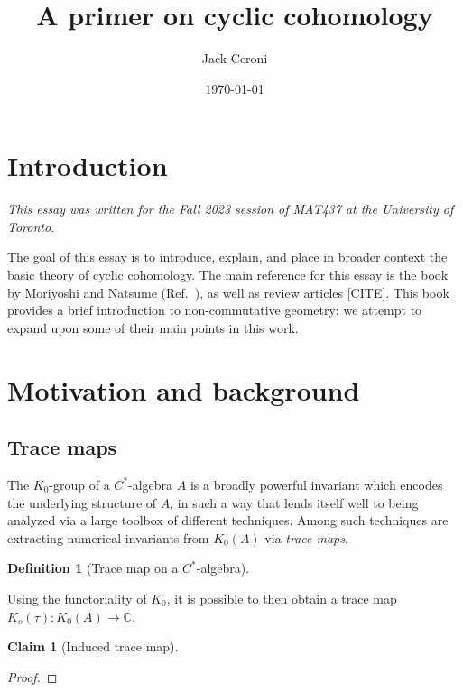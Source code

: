 \documentclass[aps,pra,showpacs,notitlepage,onecolumn,superscriptaddress,nofootinbib]{revtex4-1}
\newcommand{\hhrulefill}{\hspace{-1.0em}\hrulefill}
\theoremstyle{definition}
\newtheorem{definition}{Definition}[section]
\newtheorem{claim}{Claim}[section]
\begin{document}
\title{A primer on cyclic cohomology}
\author{Jack Ceroni}

\date{\today}

\maketitle

\section{Introduction}

\noindent \emph{This essay was written for the Fall 2023 session of MAT437 at the University of Toronto.}
\newline

\noindent The goal of this essay is to introduce, explain, and place in broader context the basic theory of cyclic cohomology. The main reference
for this essay is the book by Moriyoshi and Natsume (Ref.~\cite{}), as well as review articles [CITE]. This book provides a brief introduction to non-commutative geometry: we attempt
to expand upon some of their main points in this work.

\hhrulefill

\section{Motivation and background}

\subsection{Trace maps}

\noindent The $K_0$-group of a $C^{*}$-algebra $A$ is a broadly powerful invariant which encodes the underlying structure of $A$, in such a way that lends
itself well to being analyzed via a large toolbox of different techniques. Among such techniques are extracting numerical invariants from $K_0(A)$ via \emph{trace maps}.

\begin{definition}[Trace map on a $C^{*}$-algebra]
\end{definition}

\noindent Using the functoriality of $K_0$, it is possible to then obtain a trace map $K_o(\tau) : K_0(A) \rightarrow \mathbb{C}$.

\begin{claim}[Induced trace map]
\end{claim}
\begin{proof}
  \end{proof}
\end{document}
